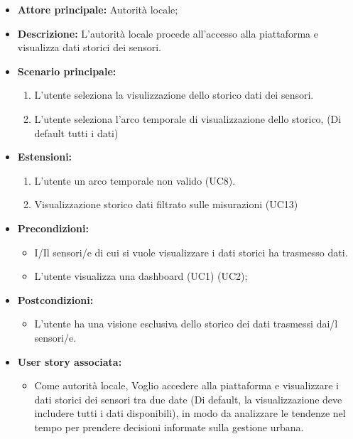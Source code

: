 \documentclass{article}
\begin{document}
\begin{itemize}
    \item \textbf{Attore principale:} Autorità locale;
    \item \textbf{Descrizione:} L'autorità locale procede all'accesso alla piattaforma e visualizza dati storici dei sensori.
    \item \textbf{Scenario principale:}
          \begin{enumerate}
              \item L'utente seleziona la visulizzazione dello storico dati dei sensori.
              \item L'utente seleziona l'arco temporale di visualizzazione dello storico, (Di default tutti i dati)
          \end{enumerate}
    \item \textbf{Estensioni:}
          \begin{enumerate}
              \item L'utente un arco temporale non valido (UC8).
              \item Visualizzazione storico dati filtrato sulle misurazioni (UC13)
          \end{enumerate}
    \item \textbf{Precondizioni:}
          \begin{itemize}
              \item  I/Il sensori/e di cui si vuole visualizzare i dati storici ha trasmesso dati.
              \item  L'utente visualizza una dashboard (UC1) (UC2);
          \end{itemize}
    \item \textbf{Postcondizioni:}
          \begin{itemize}
              \item  L'utente ha una visione esclusiva dello storico dei dati trasmessi  dai/l sensori/e.
          \end{itemize}
    \item \textbf{User story associata:}
          \begin{itemize}
              \item Come autorità locale,
                    Voglio accedere alla piattaforma e visualizzare i dati storici dei sensori tra due date (Di default, la
                    visualizzazione deve includere
                    tutti i dati disponibili),
                    in modo da analizzare le tendenze nel tempo per prendere decisioni informate sulla gestione urbana.
          \end{itemize}
\end{itemize}
\end{document}
